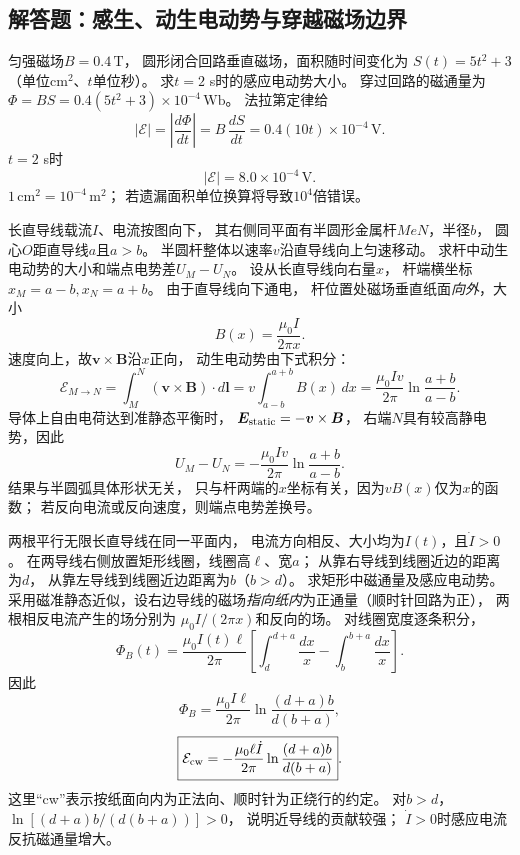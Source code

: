 
\subsection{解答题：感生、动生电动势与穿越磁场边界}

\problemtext 匀强磁场$B=0.4\,\mathrm T$，
圆形闭合回路垂直磁场，面积随时间变化为
$S(t)=5t^2+3$（单位$\mathrm{cm^2}$、$t$单位秒）。
求$t=2$ s时的感应电动势大小。
\workings
穿过回路的磁通量为
$\Phi=BS=0.4(5t^2+3)\times10^{-4}\,\mathrm{Wb}$。
法拉第定律给
\[
|\mathcal E|=\left|\frac{d\Phi}{dt}\right|
=B\,\frac{dS}{dt}
=0.4(10t)\times10^{-4}\,\mathrm V.
\]
$t=2$ s时
\[
\boxed{|\mathcal E|=8.0\times10^{-4}\,\mathrm V}.
\]
\crosscheck $1\,\mathrm{cm^2}=10^{-4}\,\mathrm{m^2}$；
若遗漏面积单位换算将导致$10^4$倍错误。

\problemtext 长直导线载流$I$、电流按图向下，
其右侧同平面有半圆形金属杆$MeN$，半径$b$，
圆心$O$距直导线$a$且$a>b$。
半圆杆整体以速率$v$沿直导线向上匀速移动。
求杆中动生电动势的大小和端点电势差$U_M-U_N$。
\workings
设从长直导线向右量$x$，
杆端横坐标$x_M=a-b,x_N=a+b$。
由于直导线向下通电，
杆位置处磁场垂直纸面\emph{向外}，大小
\[
B(x)=\frac{\mu_0I}{2\pi x}.
\]
速度向上，故$\bm v\times\bm B$沿$x$正向，
动生电动势由下式积分：
\[
\mathcal E_{M\to N}
=\int_M^N(\bm v\times\bm B)\cdot d\bm l
=v\int_{a-b}^{a+b}B(x)\,dx
=\boxed{\frac{\mu_0Iv}{2\pi}
\ln\frac{a+b}{a-b}}.
\]
导体上自由电荷达到准静态平衡时，
$\bm E_{\rm static}=-\bm v\times\bm B$，
右端$N$具有较高静电势，因此
\[
\boxed{U_M-U_N
=-\frac{\mu_0Iv}{2\pi}\ln\frac{a+b}{a-b}}.
\]
\crosscheck 结果与半圆弧具体形状无关，
只与杆两端的$x$坐标有关，因为$vB(x)$仅为$x$的函数；
若反向电流或反向速度，则端点电势差换号。

\problemtext 两根平行无限长直导线在同一平面内，
电流方向相反、大小均为$I(t)$，且$\dot I>0$。
在两导线右侧放置矩形线圈，线圈高$\ell$、宽$a$；
从靠右导线到线圈近边的距离为$d$，
从靠左导线到线圈近边距离为$b$（$b>d$）。
求矩形中磁通量及感应电动势。
\workings
采用磁准静态近似，设右边导线的磁场\emph{指向纸内}为正通量（顺时针回路为正），
两根相反电流产生的场分别为
$\mu_0I/(2\pi x)$和反向的场。
对线圈宽度逐条积分，
\[
\Phi_B(t)=\frac{\mu_0I(t)\ell}{2\pi}
\left[
\int_d^{d+a}\frac{dx}{x}
-\int_b^{b+a}\frac{dx}{x}
\right].
\]
因此
\[
\boxed{\Phi_B=
\frac{\mu_0I\ell}{2\pi}
\ln\frac{(d+a)b}{d(b+a)}},
\]
\[
\boxed{\mathcal E_{\rm cw}=
-\frac{\mu_0\ell\dot I}{2\pi}
\ln\frac{(d+a)b}{d(b+a)}}.
\]
这里“cw”表示按纸面向内为正法向、顺时针为正绕行的约定。
\crosscheck 对$b>d$，$\ln[(d+a)b/(d(b+a))]>0$，
说明近导线的贡献较强；
$\dot I>0$时感应电流反抗磁通量增大。

